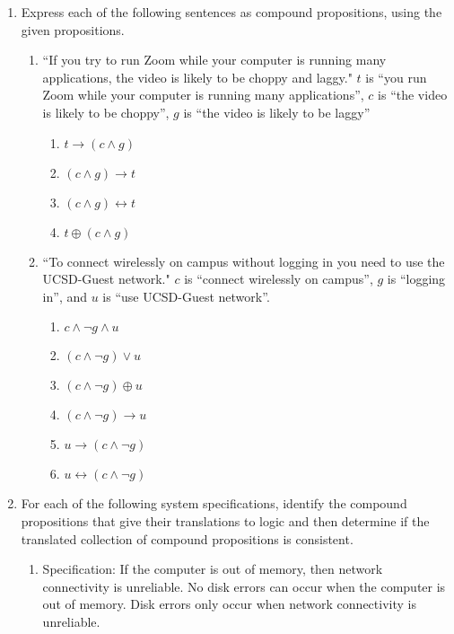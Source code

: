 \documentclass[12pt, oneside]{article}
\begin{document}
\begin{enumerate}
    \item 

Express each of the following sentences as compound propositions, using
the given propositions.

\begin{enumerate}
\item ``If you try to run Zoom while your computer is running many applications,
the video is likely to be choppy and laggy." $t$ is ``you run Zoom while your
computer is running many applications'', $c$ is ``the video is likely to be choppy'',
$g$ is ``the video is likely to be laggy''
\begin{enumerate}
    \item $t \to (c \land g)$
    \item $(c \land g) \to t$
    \item $(c \land g) \leftrightarrow t$
    \item $t \oplus (c \land g)$
\end{enumerate}
\item ``To connect wirelessly on campus without logging in you need to use
the UCSD-Guest network."  $c$ is ``connect wirelessly 
on campus'', $g$ is ``logging in'', and $u$ is ``use UCSD-Guest network''.
\begin{enumerate}
    \item $c \land \lnot g \land u$
    \item $(c \land \lnot g) \lor u$
    \item $(c \land \lnot g) \oplus u$
    \item $(c \land \lnot g) \to u$
    \item $u \to (c \land \lnot g)$
    \item $u \leftrightarrow (c \land \lnot g)$
\end{enumerate}
\end{enumerate}
\vspace{20pt}     \item 

For each of  the following  system specifications, 
identify the compound propositions  that give their
translations to logic  and then determine if the
translated collection  of compound
propositions is consistent.

\begin{enumerate}
    \item Specification: If the computer is out of memory, then network connectivity is unreliable. No disk errors can occur when the computer is out of memory. Disk
    errors only occur when network connectivity is unreliable.
    

\end{enumerate}
\end{enumerate}
\end{document}
